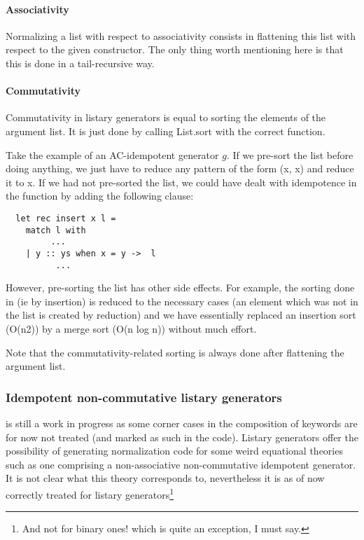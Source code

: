 \paragraph{Associativity}
Normalizing a list with respect to associativity consists in
flattening this list with respect to the given constructor.
The only thing worth mentioning here is that this is done in a
tail-recursive way.

\paragraph{Commutativity}
Commutativity in listary generators is equal to sorting the elements
of the argument list. It is just done by calling {\sf List.sort} with
the correct \compare function.

Take the example of an AC-idempotent generator $g$. If we
pre-sort the list before doing anything, we just have to reduce any
pattern of the form {\sf (x, x)} and reduce it to {\sf x}. If we had
not pre-sorted the list, we could have  dealt with idempotence in
the \insertf function by adding the following clause:

\begin{lstlisting}
  let rec insert x l =
    match l with
         ...
    | y :: ys when x = y ->  l
          ...     
\end{lstlisting}

However, pre-sorting the list has other side effects. For example, the
sorting done in \insertf (ie by insertion) is reduced to the necessary
cases (an element which was not in the list is created by reduction)
and we have essentially replaced  an insertion sort (O(n2)) by a merge
sort (O(n log n)) without much effort.

Note that the commutativity-related sorting is always done after
flattening the argument list. 

\subsubsection{Idempotent non-commutative listary generators}
\label{sec:nonassocid}

\moca is still a work in progress as some corner cases in the composition of
keywords are for now not treated (and marked as such in the code).
Listary generators offer the
possibility of generating normalization code for some weird equational
theories such as one comprising a non-associative non-commutative
idempotent generator. It is not clear what this theory corresponds to,
nevertheless it is as of now correctly treated for listary
generators\footnote{And not for binary ones! which is quite an
  exception, I must say.}

